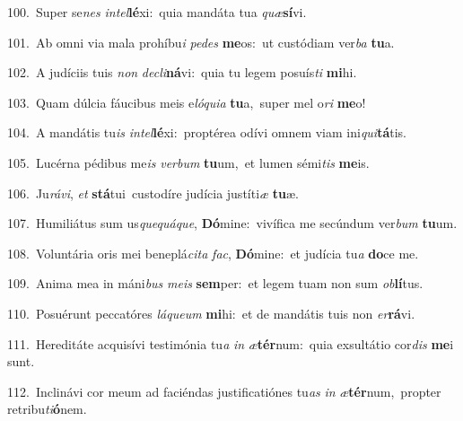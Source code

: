{\numbfont\textcolor{\numbcolor}{100.}}~Super se\textit{nes} \textit{in}\-\textit{tel}\textbf{lé}xi:~\star quia mandáta tua \textit{quæ}\-\textbf{sí}vi.\par
{\numbfont\textcolor{\numbcolor}{101.}}~Ab omni via mala prohíbu\textit{i} \textit{pe}\-\textit{des} \textbf{me}\-os:~\star ut custódiam ver\textit{ba} \textbf{tu}\-a.\par
{\numbfont\textcolor{\numbcolor}{102.}}~A judíciis tuis \textit{non} \textit{de}\-\textit{cli}\textbf{ná}vi:~\star quia tu legem posuís\textit{ti} \textbf{mi}\-hi.\par
{\numbfont\textcolor{\numbcolor}{103.}}~Quam dúlcia fáucibus meis e\-\textit{ló}\-\textit{qui}\textit{a} \textbf{tu}\-a,~\star super mel o\textit{ri} \textbf{me}\-o!\par
{\numbfont\textcolor{\numbcolor}{104.}}~A mandátis tu\textit{is} \textit{in}\-\textit{tel}\textbf{lé}xi:~\star proptérea odívi omnem viam ini\-\textit{qui}\-\textbf{tá}tis.\par
{\numbfont\textcolor{\numbcolor}{105.}}~Lucérna pédibus me\textit{is} \textit{ver}\-\textit{bum} \textbf{tu}\-um,~\star et lumen sémi\textit{tis} \textbf{me}\-is.\par
{\numbfont\textcolor{\numbcolor}{106.}}~Ju\-\textit{rá}\-\textit{vi}, \textit{et} \textbf{stá}\-tui~\star custodíre judícia justíti\textit{æ} \textbf{tu}\-æ.\par
{\numbfont\textcolor{\numbcolor}{107.}}~Humiliátus sum us\-\textit{que}\-\textit{quá}\textit{que}, \textbf{Dó}\-mine:~\star vivífica me secúndum ver\textit{bum} \textbf{tu}\-um.\par
{\numbfont\textcolor{\numbcolor}{108.}}~Voluntária oris mei beneplá\-\textit{ci}\-\textit{ta} \textit{fac}\-, \textbf{Dó}\-mine:~\star et judícia tu\textit{a} \textbf{do}\-ce me.\par
{\numbfont\textcolor{\numbcolor}{109.}}~Anima mea in máni\textit{bus} \textit{me}\-\textit{is} \textbf{sem}\-per:~\star et legem tuam non sum \textit{ob}\-\textbf{lí}tus.\par
{\numbfont\textcolor{\numbcolor}{110.}}~Posuérunt peccatóres \textit{lá}\-\textit{que}\textit{um} \textbf{mi}\-hi:~\star et de mandátis tuis non \textit{er}\-\textbf{rá}vi.\par
{\numbfont\textcolor{\numbcolor}{111.}}~Hereditáte acquisívi testimónia tu\textit{a} \textit{in} \textit{æ}\-\textbf{tér}num:~\star quia exsultátio cor\textit{dis} \textbf{me}\-i sunt.\par
{\numbfont\textcolor{\numbcolor}{112.}}~Inclinávi cor meum ad faciéndas justificatiónes tu\textit{as} \textit{in} \textit{æ}\-\textbf{tér}num,~\star propter retribu\-\textit{ti}\-\textbf{ó}nem.\par
